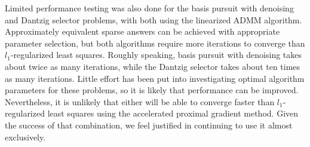 Limited performance testing was also done for the basis pursuit with denoising and Dantzig selector problems, with both using the linearized ADMM algorithm. Approximately equivalent sparse answers can be achieved with appropriate parameter selection, but both algorithms require more iterations to converge than $l_1$-regularized least squares. Roughly speaking, basis pursuit with denoising takes about twice as many iterations, while the Dantzig selector takes about ten times as many iterations. Little effort has been put into investigating optimal algorithm parameters for these problems, so it is likely that performance can be improved. Nevertheless, it is unlikely that either will be able to converge faster than $l_1$-regularized least squares using the accelerated proximal gradient method. Given the success of that combination, we feel justified in continuing to use it almost exclusively.